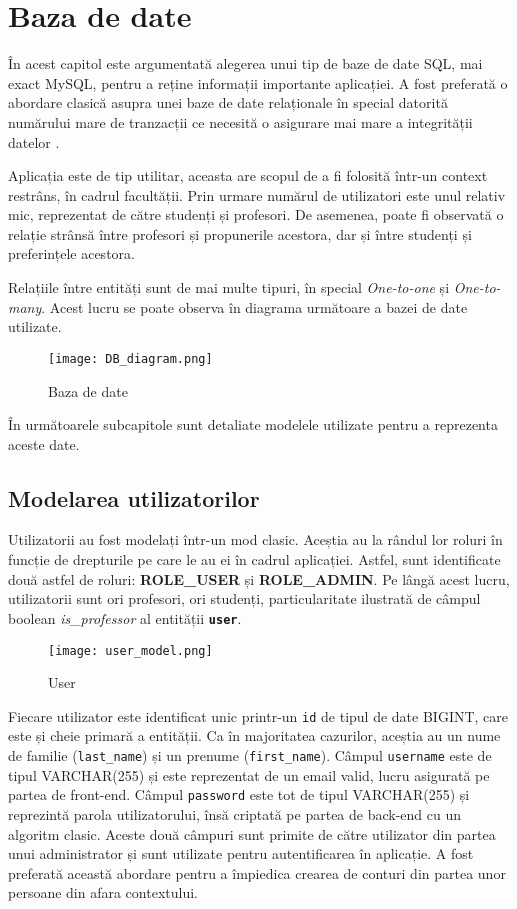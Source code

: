 \chapter{Baza de date}

În acest capitol este argumentată alegerea unui tip de baze de date SQL, mai exact MySQL, pentru a reține informații importante aplicației. A fost preferată o abordare clasică asupra unei baze de date relaționale în special datorită numărului mare de tranzacții ce necesită o asigurare mai mare a integrității datelor \cite{sql1}.

Aplicația \thesistitle este de tip utilitar, aceasta are scopul de a fi folosită într-un context restrâns, în cadrul facultății. Prin urmare numărul de utilizatori este unul relativ mic, reprezentat de către studenți și profesori. De asemenea, poate fi observată o relație strânsă între profesori și propunerile acestora, dar și între studenți și preferințele acestora.

Relațiile între entități sunt de mai multe tipuri, în special \textit{One-to-one} și \textit{One-to-many}. Acest lucru se poate observa în diagrama următoare a bazei de date utilizate.

\begin{figure}[H]
	\centering
	\texttt{[image: DB\_diagram.png]}
	\caption{Baza de date}
\end{figure}

În următoarele subcapitole sunt detaliate modelele utilizate pentru a reprezenta aceste date.

\section{Modelarea utilizatorilor}

Utilizatorii au fost modelați într-un mod clasic. Aceștia au la rândul lor roluri în funcție de drepturile pe care le au ei în cadrul aplicației. Astfel, sunt identificate două astfel de roluri: \textbf{ROLE\_USER} și \textbf{ROLE\_ADMIN}. Pe lângă acest lucru, utilizatorii sunt ori profesori, ori studenți, particularitate ilustrată de câmpul boolean \textit{is\_professor} al entității \textbf{\texttt{user}}.

\begin{figure}[H]
	\centering
	\texttt{[image: user\_model.png]}
	\caption{User}
\end{figure}

Fiecare utilizator este identificat unic printr-un \texttt{id} de tipul de date BIGINT, care este și cheie primară a entității. Ca în majoritatea cazurilor, aceștia au un nume de familie (\texttt{last\_name}) și un prenume (\texttt{first\_name}). Câmpul \texttt{username} este de tipul VARCHAR(255) și este reprezentat de un email valid, lucru asigurată pe partea de front-end. Câmpul \texttt{password} este tot de tipul VARCHAR(255) și reprezintă parola utilizatorului, însă criptată pe partea de back-end cu un algoritm clasic.
Aceste două câmpuri sunt primite de către utilizator din partea unui administrator și sunt utilizate pentru autentificarea în aplicație. A fost preferată această abordare pentru a împiedica crearea de conturi din partea unor persoane din afara contextului.

